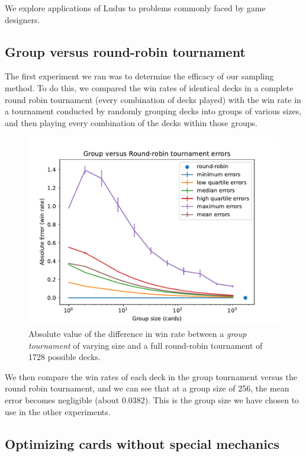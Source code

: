 We explore applications of {\sc Ludus} to problems commonly faced by game designers.

\subsection{Group versus round-robin tournament}

The first experiment we ran was to determine the efficacy of our sampling method. To do this, we compared the win rates of identical decks in a complete round robin tournament (every combination of decks played) with the win rate in a tournament conducted by randomly grouping decks into groups of various sizes, and then playing every combination of the decks within those groups.

\begin{figure}[t]
	\centering
	\includegraphics[width=0.9\columnwidth]{group_vs_rr_fig}
	\caption{Absolute value of the difference in win rate between a \textit{group tournament} of varying size and a full round-robin tournament of 1728 possible decks. %
	}
	\label{fig:group_vs_rr}
\end{figure}


We then compare the win rates of each deck in the group tournament versus the round robin tournament, and we can see that at a group size of 256, the mean error becomes negligible (about 0.0382). This is the group size we have chosen to use in the other experiments.


 \subsection{Optimizing cards without special mechanics}

